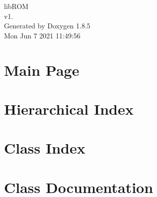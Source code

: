 \documentclass[twoside]{book}
\newcommand{\clearemptydoublepage}{%
  \newpage{\pagestyle{empty}\cleardoublepage}%
}
\begin{document}
\hypersetup{pageanchor=false}
\begin{titlepage}
\vspace*{7cm}
\begin{center}%
{\Large lib\-R\-O\-M \\[1ex]\large v1. }\\
\vspace*{1cm}
{\large Generated by Doxygen 1.8.5}\\
\vspace*{0.5cm}
{\small Mon Jun 7 2021 11:49:56}\\
\end{center}
\end{titlepage}
\clearemptydoublepage
\tableofcontents
\clearemptydoublepage
{}
\hypersetup{pageanchor=true}

\chapter{Main Page}
\label{index}\hypertarget{index}{}
\chapter{Hierarchical Index}

\chapter{Class Index}

\chapter{Class Documentation}





















\newpage
{}
{}
\printindex
\end{document}
